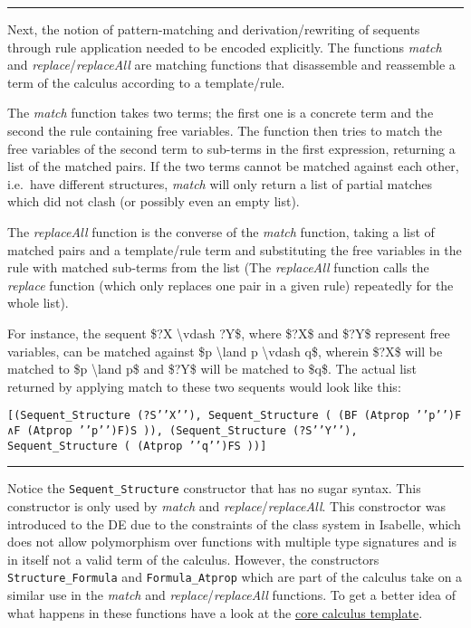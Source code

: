 \documentclass[]{article}
\begin{document}
\begin{center}\rule{3in}{0.4pt}\end{center}

Next, the notion of pattern-matching and derivation/rewriting of
sequents through rule application needed to be encoded explicitly. The
functions \emph{match} and \emph{replace}/\emph{replaceAll} are matching
functions that disassemble and reassemble a term of the calculus
according to a template/rule.

The \emph{match} function takes two terms; the first one is a concrete
term and the second the rule containing free variables. The function
then tries to match the free variables of the second term to sub-terms
in the first expression, returning a list of the matched pairs. If the
two terms cannot be matched against each other, i.e.~have different
structures, \emph{match} will only return a list of partial matches
which did not clash (or possibly even an empty list).

The \emph{replaceAll} function is the converse of the \emph{match}
function, taking a list of matched pairs and a template/rule term and
substituting the free variables in the rule with matched sub-terms from
the list (The \emph{replaceAll} function calls the \emph{replace}
function (which only replaces one pair in a given rule) repeatedly for
the whole list).

For instance, the sequent \$?X \textbackslash{}vdash ?Y\$, where \$?X\$
and \$?Y\$ represent free variables, can be matched against \$p
\textbackslash{}land p \textbackslash{}vdash q\$, wherein \$?X\$ will be
matched to \$p \textbackslash{}land p\$ and \$?Y\$ will be matched to
\$q\$. The actual list returned by applying match to these two sequents
would look like this:

\begin{verbatim}
[(Sequent_Structure (?S’’X’’), Sequent_Structure ( (BF (Atprop ’’p’’)F ∧F (Atprop ’’p’’)F)S )), (Sequent_Structure (?S’’Y’’), Sequent_Structure ( (Atprop ’’q’’)FS ))]
\end{verbatim}

\begin{center}\rule{3in}{0.4pt}\end{center}

Notice the \texttt{Sequent\_Structure} constructor that has no sugar
syntax. This constructor is only used by \emph{match} and
\emph{replace}/\emph{replaceAll}. This constroctor was introduced to the
DE due to the constraints of the class system in Isabelle, which does
not allow polymorphism over functions with multiple type signatures and
is in itself not a valid term of the calculus. However, the constructors
\texttt{Structure\_Formula} and \texttt{Formula\_Atprop} which are part
of the calculus take on a similar use in the \emph{match} and
\emph{replace}/\emph{replaceAll} functions. To get a better idea of what
happens in these functions have a look at the
\href{https://github.com/goodlyrottenapple/calculus-toolbox/blob/master/template/Calc_Core.thy}{core
calculus template}.
\end{document}
